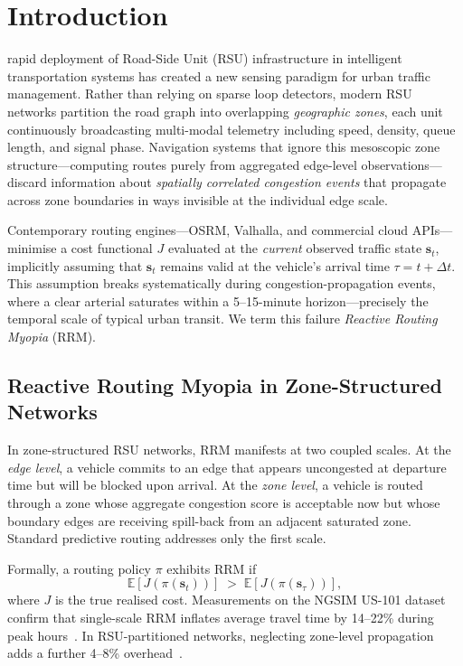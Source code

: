 \documentclass[journal,letterpaper,10pt]{IEEEtran}
\theoremstyle{definition}
\theoremstyle{remark}
\newcommand{\E}{\mathbb{E}}
\begin{document}
\section{Introduction}
\label{sec:intro}

 rapid deployment of Road-Side Unit (RSU)
infrastructure in intelligent transportation systems has created a
new sensing paradigm for urban traffic management.  Rather than
relying on sparse loop detectors, modern RSU networks partition the
road graph into overlapping \emph{geographic zones}, each unit
continuously broadcasting multi-modal telemetry including speed,
density, queue length, and signal phase.  Navigation systems that
ignore this mesoscopic zone structure---computing routes purely from
aggregated edge-level observations---discard information about
\emph{spatially correlated congestion events} that propagate across
zone boundaries in ways invisible at the individual edge scale.

Contemporary routing engines---OSRM, Valhalla, and commercial cloud
APIs---minimise a cost functional $J$ evaluated at the \emph{current}
observed traffic state $\mathbf{s}_{t}$, implicitly assuming that
$\mathbf{s}_{t}$ remains valid at the vehicle's arrival time
$\tau = t + \Delta t$.  This assumption breaks systematically during
congestion-propagation events, where a clear arterial saturates within
a 5--15-minute horizon---precisely the temporal scale of typical urban
transit.  We term this failure \emph{Reactive Routing Myopia} (RRM).

\subsection{Reactive Routing Myopia in Zone-Structured Networks}

In zone-structured RSU networks, RRM manifests at two coupled scales.
At the \emph{edge level}, a vehicle commits to an edge that appears
uncongested at departure time but will be blocked upon arrival.
At the \emph{zone level}, a vehicle is routed through a zone whose
aggregate congestion score is acceptable now but whose boundary edges
are receiving spill-back from an adjacent saturated zone.  Standard
predictive routing addresses only the first scale.

Formally, a routing policy $\pi$ exhibits RRM if
\begin{equation}
  \E\!\left[J\!\left(\pi(\mathbf{s}_{t})\right)\right]
  \;>\;
  \E\!\left[J\!\left(\pi(\mathbf{s}_{\tau})\right)\right],
  \label{eq:rrm}
\end{equation}
where $J$ is the true realised cost.  Measurements on the NGSIM
US-101 dataset confirm that single-scale RRM inflates average travel
time by 14--22\% during peak hours~\cite{ngsim2006}.  In RSU-partitioned
networks, neglecting zone-level propagation adds a further 4--8\%
overhead~\cite{sun2015velocity}.
\end{document}

